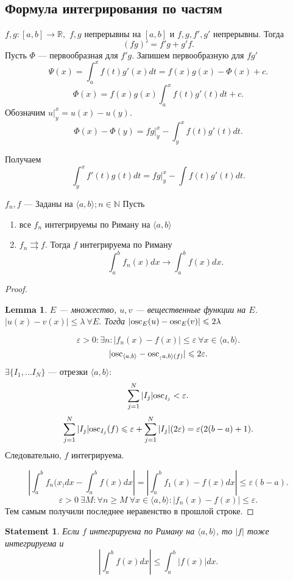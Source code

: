 \documentclass[11pt]{book}
\newcommand{\N}{\mathbb{N}}
\newcommand{\R}{\mathbb{R}}
\newcommand{\osc}{{\mathop{\text{\rm osc}}}}
\renewcommand{\le}{\leqslant}
\renewcommand{\ge}{\geqslant}
\theoremstyle{definition}
\theoremstyle{plain}
\theoremstyle{plain}
\newtheorem*{lm}{Lemma}
\newtheorem*{st}{Statement}
\theoremstyle{definition}
\theoremstyle{remark}
\begin{document}
\subsection{Формула интегрирования по частям}
$ f, g : [a, b] \to  \R, $ $ f, g$   непрерывны на $ [a, b]$ и $ f, g, f', g'$   непрерывны.
Тогда \[
    (fg)' = f' g+g'f
.\]
Пусть $ \Phi$ --- первообразная для $ f' g$.
Запишем первообразную для $ fg'$
\[
    \Psi (x) = \int_a^{x} f(t) g'(x) dt = f(x) g(x) - \Phi (x) + c
.\]
\[
    \Phi (x) = f(x) g(x) \int_a^{x} f(t) g'(t) dt + c
.\]
Обозначим $ u |_y^{x} = u(x) - u(y)$.
\[
    \Phi (x) - \Phi(y) = fg |_y^{x} - \int_y^{x} f(t)g'(t)dt
.\]

Получаем
\[
    \int_y^{x} f'(t) g(t) dt = fg |_y^{x} - \int f(t) g'(t) dt
.\]
\begin{thm}
    $ f_n, f$ --- Заданы на $ \langle a, b \rangle; n \in \N$
    Пусть
    \begin{enumerate}
	\item все $ f_n$ интегрируемы по Риману на $ \langle a, b \rangle$
	\item $ f_n \rightrightarrows f$. Тогда  $ f$ интегрируема по Риману
	    \[
		\int_a^{b}f_n(x) dx \to \int_a^{b}f(x) dx
	    .\]
    \end{enumerate}
\end{thm}
\begin{proof}
    \begin{lm}
	$ E$ --- множество, $ u, v $ --- вещественные функции на $ E$. $ |u(x) - v(x) | \le  \lambda ~ \forall  E.$
	Тогда $ |\osc_E(u) - \osc_E(v) | \le  2 \lambda$
    \end{lm}
    \[
	\varepsilon  >0: \exists  n: |f_n(x) - f(x)| \le \varepsilon ~ \forall x \in  \langle a, b \rangle
    .\]
    \[
	|\osc_{\langle a, b \rangle} - \osc_{_\langle a, b \rangle(f)}| \le 2 \varepsilon
    .\]
    $\exists  \{I_1, \ldots I_N \} $ --- отрезки $ \langle  a, b \rangle$:
    \[
	\sum_{j=1}^{N }|I_j| \osc_{I_j} < \varepsilon
    .\]
    \[
	\sum_{j=1}^{N} |I_j| \osc_{I_j}(f)  \le  \varepsilon +\sum_{j=1}^{N} |I_j| (2 \varepsilon ) = \varepsilon (2 (b-a) + 1)
    .\]
    Следовательно, $ f$   интегрируема.

    \[
	\left|\int_a^{b} f_n(x_) dx - \int _a^{b}f(x) dx \right|= \left|\int_a^{b} f_1(x) - f(x) dx\right| \le  \varepsilon (b-a)
    .\]
    \[
	\varepsilon  >0  ~ \exists M : \forall n \ge M ~ \forall  x \in  \langle a, b \rangle: |f_n(x) - f(x) | \le  \varepsilon
    .\]
    Тем самым получили последнее неравенство в прошлой строке.
\end{proof}
\begin{st}
    Если $ f$ интегрируема по Риману на $ \langle  a,b \rangle$, то $ |f|$ тоже интегрируема и \[
	\left |\int_a ^{b} f(x) dx\right| \le  \int_a^{b} |f(x) |dx
    .\]
\end{st}
\end{document}
